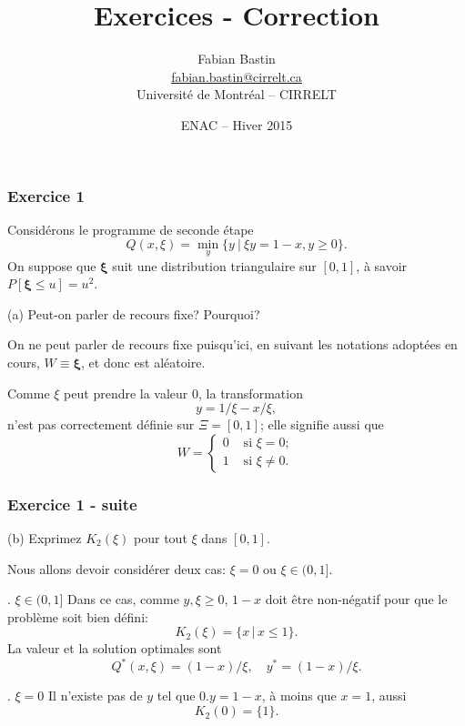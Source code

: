 \documentclass{beamer}
\title{Exercices - Correction}
\author[Fabian Bastin]{Fabian Bastin\\\url{fabian.bastin@cirrelt.ca}\\Université de Montréal -- CIRRELT}
\date{ENAC -- Hiver 2015}
\def\bxi{\boldsymbol\xi}
\begin{document}
\frame{\titlepage}

\begin{frame}
\frametitle{Exercice 1}

Considérons le programme de seconde étape
\[
Q(x, \xi) = \min_y \lbrace y \ |\ \xi y = 1-x, y \geq 0 \rbrace.
\]
On suppose que $\bxi$ suit une distribution triangulaire sur $[0,1]$,
à savoir $P[\bxi \leq u] = u^2$.

\mbox{}

{\blue (a)}
Peut-on parler de recours fixe? Pourquoi?

\mbox{}

On ne peut parler de recours fixe puisqu'ici, en suivant
les notations adoptées en cours, $W \equiv \bxi$, et donc est aléatoire.

Comme $\xi$ peut prendre la valeur 0, la transformation
\[
y = 1/\xi - x/\xi,
\]
n'est pas correctement définie sur $\Xi = [0,1]$; elle signifie aussi que
\[
W =
\begin{cases}
0 & \mbox{ si } \xi = 0; \\
1 & \mbox{ si } \xi \ne 0.
\end{cases}
\]

\end{frame}

\begin{frame}
\frametitle{Exercice 1 - suite}

{\blue (b)} Exprimez $K_2(\xi)$ pour tout $\xi$ dans $[0,1]$.

\mbox{}

Nous allons devoir considérer deux cas: $\xi = 0$ ou $\xi \in (0,1]$.

\mbox{}

{. $\xi \in (0,1]$} Dans ce cas, comme $y, \xi \geq 0$, $1-x$ doit
être non-négatif pour que le problème soit bien défini:
\[
K_2(\xi) = \lbrace x\,|\, x \leq 1 \rbrace.
\]
La valeur et la solution optimales sont
\[
Q^*(x,\xi) = (1-x)/\xi,\quad y^*= (1-x)/\xi.
\]

{. $\xi=0$} Il n'existe pas de $y$ tel que $0.y = 1-x$, à moins
que $x = 1$, aussi
\[
K_2(0) = \lbrace 1 \rbrace.
\]

\end{frame}
\end{document}
